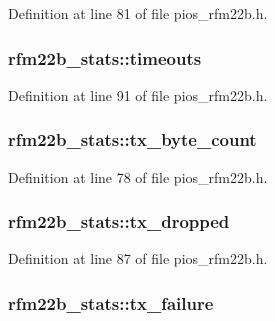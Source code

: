 Definition at line 81 of file pios\-\_\-rfm22b.\-h.

\hypertarget{structrfm22b__stats_ae710ec372ffa9365a23fcd2d8f9f8e0e}{
\subsubsection[{timeouts}]{ rfm22b\-\_\-stats\-::timeouts}}\label{structrfm22b__stats_ae710ec372ffa9365a23fcd2d8f9f8e0e}


Definition at line 91 of file pios\-\_\-rfm22b.\-h.

\hypertarget{structrfm22b__stats_a3f3b0ee5d6c3557da05b35b54102da71}{
\subsubsection[{tx\-\_\-byte\-\_\-count}]{ rfm22b\-\_\-stats\-::tx\-\_\-byte\-\_\-count}}\label{structrfm22b__stats_a3f3b0ee5d6c3557da05b35b54102da71}


Definition at line 78 of file pios\-\_\-rfm22b.\-h.

\hypertarget{structrfm22b__stats_a40ecedccb96317654da5118ca167bfe4}{
\subsubsection[{tx\-\_\-dropped}]{ rfm22b\-\_\-stats\-::tx\-\_\-dropped}}\label{structrfm22b__stats_a40ecedccb96317654da5118ca167bfe4}


Definition at line 87 of file pios\-\_\-rfm22b.\-h.

\hypertarget{structrfm22b__stats_ae443df4225a025395b7fa6caea562a74}{
\subsubsection[{tx\-\_\-failure}]{ rfm22b\-\_\-stats\-::tx\-\_\-failure}}\label{structrfm22b__stats_ae443df4225a025395b7fa6caea562a74}


